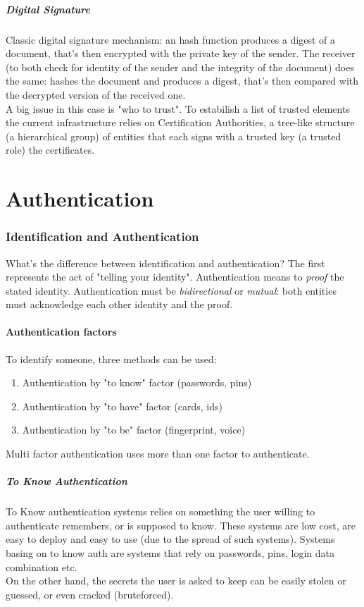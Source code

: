 \documentclass{article}
\begin{document}
				\subsubsection{Digital Signature}
					Classic digital signature mechanism: an hash function produces a digest of a document, that's then encrypted with the private key of the sender. The receiver (to both check for identity of the sender and the integrity of the document) does the same: hashes the document and produces a digest, that's then compared with the decrypted version of the received one.\\
					A big issue in this case is "who to trust". To estabilish a list of trusted elements the current infrastructure relies on Certification Authorities, a tree-like structure (a hierarchical group) of entities that each signs with a trusted key (a trusted role) the certificates.
			
	\clearpage \part{Authentication}
		\section{Identification and Authentication}
			What's the difference between identification and authentication? The first represents the act of "telling your identity". Authentication means to \emph{proof} the stated identity. Authentication must be \emph{bidirectional} or \emph{mutual}: both entities must acknowledge each other identity and the proof.
			
			\subsection{Authentication factors}
				To identify someone, three methods can be used:
				\begin{enumerate}
					\item Authentication by "to know" factor (passwords, pins)
					\item Authentication by "to have" factor (cards, ids)
					\item Authentication by "to be" factor (fingerprint, voice)
				\end{enumerate}
				Multi factor authentication uses more than one factor to authenticate.
				
				\subsubsection{To Know Authentication}
					To Know authentication systems relies on something the user willing to authenticate remembers, or is supposed to know. These systems are low cost, are easy to deploy and easy to use (due to the spread of such systems). Systems basing on to know auth are systems that rely on passwords, pins, login data combination etc.\\
					On the other hand, the secrets the user is asked to keep can be easily stolen or guessed, or even cracked (bruteforced). 
					
\end{document}
